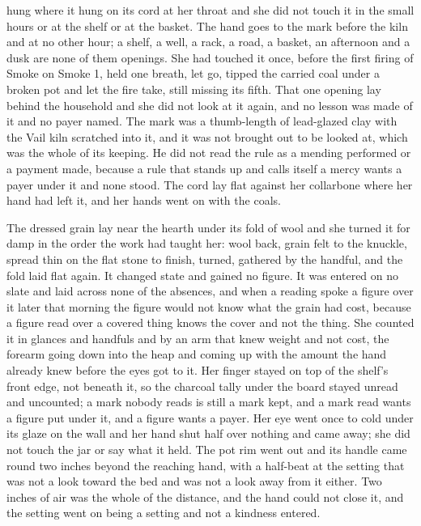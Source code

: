  hung where it hung on its cord at her throat and she did not touch it in the small hours or at the shelf or at the basket. The hand goes to the mark before the kiln and at no other hour; a shelf, a well, a rack, a road, a basket, an afternoon and a dusk are none of them openings. She had touched it once, before the first firing of Smoke on Smoke 1, held one breath, let go, tipped the carried coal under a broken pot and let the fire take, still missing its fifth. That one opening lay behind the household and she did not look at it again, and no lesson was made of it and no payer named. The mark was a thumb-length of lead-glazed clay with the Vail kiln scratched into it, and it was not brought out to be looked at, which was the whole of its keeping. He did not read the rule as a mending performed or a payment made, because a rule that stands up and calls itself a mercy wants a payer under it and none stood. The cord lay flat against her collarbone where her hand had left it, and her hands went on with the coals.

\scenebreak

The dressed grain lay near the hearth under its fold of wool and she turned it for damp in the order the work had taught her: wool back, grain felt to the knuckle, spread thin on the flat stone to finish, turned, gathered by the handful, and the fold laid flat again. It changed state and gained no figure. It was entered on no slate and laid across none of the absences, and when a reading spoke a figure over it later that morning the figure would not know what the grain had cost, because a figure read over a covered thing knows the cover and not the thing. She counted it in glances and handfuls and by an arm that knew weight and not cost, the forearm going down into the heap and coming up with the amount the hand already knew before the eyes got to it. Her finger stayed on top of the shelf's front edge, not beneath it, so the charcoal tally under the board stayed unread and uncounted; a mark nobody reads is still a mark kept, and a mark read wants a figure put under it, and a figure wants a payer. Her eye went once to  cold under its glaze on the wall and her hand shut half over nothing and came away; she did not touch the jar or say what it held. The pot rim went out and its handle came round two inches beyond the reaching hand, with a half-beat at the setting that was not a look toward the bed and was not a look away from it either. Two inches of air was the whole of the distance, and the hand could not close it, and the setting went on being a setting and not a kindness entered.

